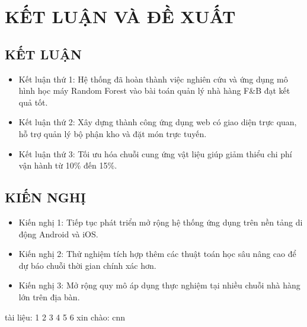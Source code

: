 \chapter{KẾT LUẬN VÀ ĐỀ XUẤT}\label{chap4_intro}
\vspace{-40pt}

\section{KẾT LUẬN}
\begin{itemize}
    \item Kết luận thứ 1: Hệ thống đã hoàn thành việc nghiên cứu và ứng dụng mô hình học máy Random Forest vào bài toán quản lý nhà hàng F\&B đạt kết quả tốt.
    \item Kết luận thứ 2: Xây dựng thành công ứng dụng web có giao diện trực quan, hỗ trợ quản lý bộ phận kho và đặt món trực tuyến.
    \item Kết luận thứ 3: Tối ưu hóa chuỗi cung ứng vật liệu giúp giảm thiểu chi phí vận hành từ 10\% đến 15\%.
\end{itemize}

\section{KIẾN NGHỊ}
\begin{itemize}
    \item Kiến nghị 1: Tiếp tục phát triển mở rộng hệ thống ứng dụng trên nền tảng di động Android và iOS.
    \item Kiến nghị 2: Thử nghiệm tích hợp thêm các thuật toán học sâu nâng cao để dự báo chuỗi thời gian chính xác hơn.
    \item Kiến nghị 3: Mở rộng quy mô áp dụng thực nghiệm tại nhiều chuỗi nhà hàng lớn trên địa bàn.
\end{itemize}
tài liệu: 1 \cite{tapchi} 2 \cite{chuong} 3 \cite{giaotrinh} 4 \cite{luanvan} 5 \cite{hoithao} 6 \cite{internet} 
xin chào: \ac{cnn}